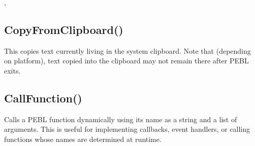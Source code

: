 \documentclass[letterpaper,10pt,english]{sphinxmanual}
\begin{document}
\sphinxAtStartPar
{}

\sphinxAtStartPar
{}, 

\ignorespaces 

\subsection{CopyFromClipboard()}
\label{\detokenize{reference/peblenvironment:copyfromclipboard}}\label{\detokenize{reference/peblenvironment:index-1}}
\sphinxAtStartPar
{}

\sphinxAtStartPar
{}

\sphinxAtStartPar
This copies text currently living in the system clipboard. Note that (depending on platform), text copied into the clipboard may not remain there after PEBL exits.

\sphinxAtStartPar
{}

\begin{sphinxVerbatim}[commandchars=\\\{\}]
\end{sphinxVerbatim}

\sphinxAtStartPar
{}

\sphinxAtStartPar
{}

\ignorespaces 

\subsection{CallFunction()}
\label{\detokenize{reference/peblenvironment:callfunction}}\label{\detokenize{reference/peblenvironment:index-2}}
\sphinxAtStartPar
{}

\sphinxAtStartPar
{}

\sphinxAtStartPar
Calls a PEBL function dynamically using its name as a string and a list of arguments. This is useful for implementing callbacks, event handlers, or calling functions whose names are determined at runtime.
\end{document}
